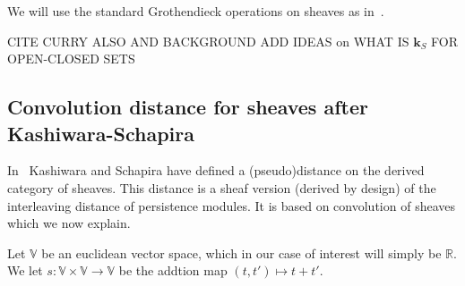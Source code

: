 \documentclass[a4paper, english, 11pt]{article}
\newcommand{\kk}[0]{\textbf{k}}
\newcommand{\0}{\vec{0}}
\newcommand{\R}[0]{\mathbb{R}}
\newcommand{\V}[0]{\mathbb{V}}
\begin{document}
We will use the standard Grothendieck operations on sheaves as in~\cite{Kash90}.  
 
 CITE CURRY ALSO AND BACKGROUND ADD IDEAS on WHAT IS $\kk_S $ FOR OPEN-CLOSED SETS
 
\subsection{Convolution distance for sheaves after Kashiwara-Schapira}
In~\cite{KS18} Kashiwara and Schapira have defined a (pseudo)distance on the derived category of sheaves. This distance is a sheaf version (derived by design)  of the interleaving distance of persistence modules. It is based on convolution of sheaves which we now explain. 

Let  $\V$  be an euclidean vector space, which in our case of interest will simply be $\R$. We let $s: \V\times \V \to \V$ be the addtion map $(t,t')\mapsto t+t'$.  
\end{document}
